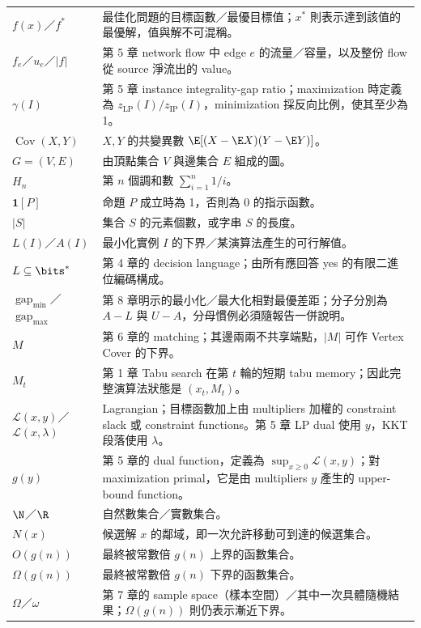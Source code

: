 \documentclass[11pt,a4paper,oneside,openany]{book}
\begin{document}
\begin{longtable}{@{}p{}p{}@{}}
$f(x)$／$f^*$ & 最佳化問題的目標函數／最優目標值；$x^*$ 則表示達到該值的最優解，值與解不可混稱。 \\
$f_e$／$u_e$／$|f|$ & 第 5 章 network flow 中 edge $e$ 的流量／容量，以及整份 flow 從 source 淨流出的 value。 \\
$\gamma(I)$ & 第 5 章 instance integrality-gap ratio；maximization 時定義為 $z_{\mathrm{LP}}(I)/z_{\mathrm{IP}}(I)$，minimization 採反向比例，使其至少為 1。 \\
$\operatorname{Cov}(X,Y)$ & $X,Y$ 的共變異數 $\E[(X-\E X)(Y-\E Y)]$。 \\
$G=(V,E)$ & 由頂點集合 $V$ 與邊集合 $E$ 組成的圖。 \\
$H_n$ & 第 $n$ 個調和數 $\sum_{i=1}^n 1/i$。 \\
$\mathbf 1[P]$ & 命題 $P$ 成立時為 1，否則為 0 的指示函數。 \\
$|S|$ & 集合 $S$ 的元素個數，或字串 $S$ 的長度。 \\
$L(I)$／$A(I)$ & 最小化實例 $I$ 的下界／某演算法產生的可行解值。 \\
$L\subseteq\bits^*$ & 第 4 章的 decision language；由所有應回答 yes 的有限二進位編碼構成。 \\
$\operatorname{gap}_{\min}$／$\operatorname{gap}_{\max}$ & 第 8 章明示的最小化／最大化相對最優差距；分子分別為 $A-L$ 與 $U-A$，分母慣例必須隨報告一併說明。 \\
$M$ & 第 6 章的 matching；其邊兩兩不共享端點，$|M|$ 可作 Vertex Cover 的下界。 \\
$M_t$ & 第 1 章 Tabu search 在第 $t$ 輪的短期 tabu memory；因此完整演算法狀態是 $(x_t,M_t)$。 \\
$\mathcal L(x,y)$／$\mathcal L(x,\lambda)$ & Lagrangian；目標函數加上由 multipliers 加權的 constraint slack 或 constraint functions。第 5 章 LP dual 使用 $y$，KKT 段落使用 $\lambda$。 \\
$g(y)$ & 第 5 章的 dual function，定義為 $\sup_{x\ge0}\mathcal L(x,y)$；對 maximization primal，它是由 multipliers $y$ 產生的 upper-bound function。 \\
$\N$／$\R$ & 自然數集合／實數集合。 \\
$N(x)$ & 候選解 $x$ 的鄰域，即一次允許移動可到達的候選集合。 \\
$O(g(n))$ & 最終被常數倍 $g(n)$ 上界的函數集合。 \\
$\Omega(g(n))$ & 最終被常數倍 $g(n)$ 下界的函數集合。 \\
$\Omega$／$\omega$ & 第 7 章的 sample space（樣本空間）／其中一次具體隨機結果；$\Omega(g(n))$ 則仍表示漸近下界。 \\

\end{longtable}
\end{document}

